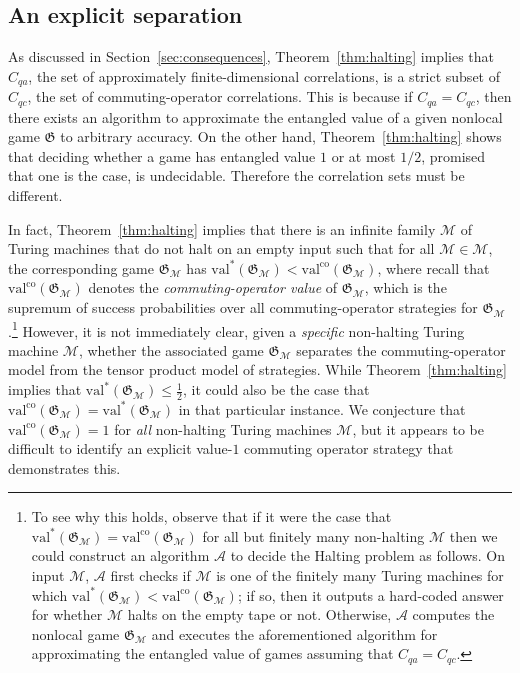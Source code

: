 \documentclass[11pt]{article}
\theoremstyle{definition}
\newcommand{\val}{\ensuremath{\mathrm{val}}}
\newcommand{\valco}{\ensuremath{\mathrm{val}^{\mathrm{co}}}}
\newcommand{\game}{\mathfrak{G}}
\newcommand{\machine}{\cal{M}}
\renewcommand{\cal}[1]{\mathcal{#1}}
\begin{document}
\subsection{An explicit separation}
\label{sec:separation}

As discussed in Section~\ref{sec:consequences}, Theorem~\ref{thm:halting}
implies that $C_{qa}$, the set of approximately finite-dimensional correlations,
is a strict subset of $C_{qc}$, the set of commuting-operator correlations.
This is because if $C_{qa} = C_{qc}$, then there exists an algorithm to
approximate the entangled value of a given nonlocal game $\game$ to arbitrary
accuracy.
On the other hand, Theorem~\ref{thm:halting} shows that deciding whether a game
has entangled value $1$ or at most $1/2$, promised that one is the case, is
undecidable.
Therefore the correlation sets must be different. 

In fact, Theorem~\ref{thm:halting} implies that there is an infinite family
$\mathscr{M}$ of Turing machines that do not halt on an empty input such
that for all $\cal{M} \in \mathscr{M}$, the corresponding game $\game_\machine$
has $\val^*(\game_\machine) < \valco(\game_\machine)$, where recall that
$\valco(\game_\machine)$ denotes the \emph{commuting-operator value} of
$\game_\machine$, which is the supremum of success probabilities over all
commuting-operator strategies for $\game_\machine$.\footnote{To see why this
  holds, observe that if it were the case that $\val^*(\game_\machine) =
  \valco(\game_\machine)$ for all but finitely many non-halting $\machine$
  then we could construct an algorithm $\cal{A}$ to decide the Halting problem
  as follows.
  On input $\cal{M}$, $\cal{A}$ first checks if $\cal{M}$ is one of the finitely
  many Turing machines for which $\val^*(\game_\machine) <
  \valco(\game_\machine)$; if so, then it outputs a hard-coded answer for
  whether $\cal{M}$ halts on the empty tape or not.
  Otherwise, $\cal{A}$ computes the nonlocal game $\game_\machine$ and executes
  the aforementioned algorithm for approximating the entangled value of games
  assuming that $C_{qa} = C_{qc}$.
}
However, it is not immediately clear, given a \emph{specific} non-halting Turing
machine $\cal{M}$, whether the associated game $\game_\machine$ separates the
commuting-operator model from the tensor product model of strategies.
While Theorem~\ref{thm:halting} implies that $\val^*(\game_\machine) \leq
\frac{1}{2}$, it could also be the case that $\valco(\game_\machine) =
\val^*(\game_\machine)$ in that particular instance.
We conjecture that $\valco(\game_\machine) = 1$ for \emph{all} non-halting
Turing machines $\cal{M}$, but it appears to be difficult to identify an
explicit value-$1$ commuting operator strategy that demonstrates this.
\end{document}
